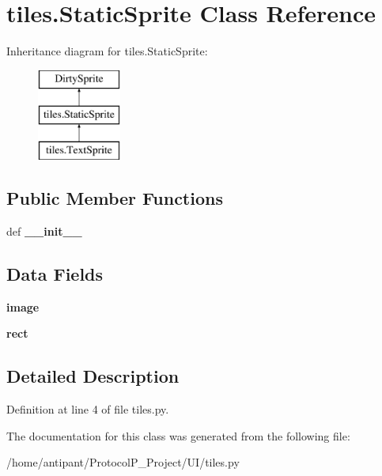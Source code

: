 \hypertarget{classtiles_1_1StaticSprite}{\section{tiles.\-Static\-Sprite Class Reference}
\label{classtiles_1_1StaticSprite}
}
Inheritance diagram for tiles.\-Static\-Sprite\-:\begin{figure}[H]
\begin{center}
\leavevmode
\includegraphics[height=3.000000cm]{classtiles_1_1StaticSprite}
\end{center}
\end{figure}
\subsection*{Public Member Functions}
\begin{DoxyCompactItemize}
\item 
\hypertarget{classtiles_1_1StaticSprite_af23e7a9b77408f4ac429cc680cdb74d6}{def {\bfseries \-\_\-\-\_\-init\-\_\-\-\_\-}}\label{classtiles_1_1StaticSprite_af23e7a9b77408f4ac429cc680cdb74d6}

\end{DoxyCompactItemize}
\subsection*{Data Fields}
\begin{DoxyCompactItemize}
\item 
\hypertarget{classtiles_1_1StaticSprite_a09114e04f50b1dec8525af745f8e34b9}{{\bfseries image}}\label{classtiles_1_1StaticSprite_a09114e04f50b1dec8525af745f8e34b9}

\item 
\hypertarget{classtiles_1_1StaticSprite_a4cd5482f618aeb1c835c120e0ea4fcea}{{\bfseries rect}}\label{classtiles_1_1StaticSprite_a4cd5482f618aeb1c835c120e0ea4fcea}

\end{DoxyCompactItemize}


\subsection{Detailed Description}


Definition at line 4 of file tiles.\-py.



The documentation for this class was generated from the following file\-:\begin{DoxyCompactItemize}
\item 
/home/antipant/\-Protocol\-P\-\_\-\-Project/\-U\-I/tiles.\-py\end{DoxyCompactItemize}
